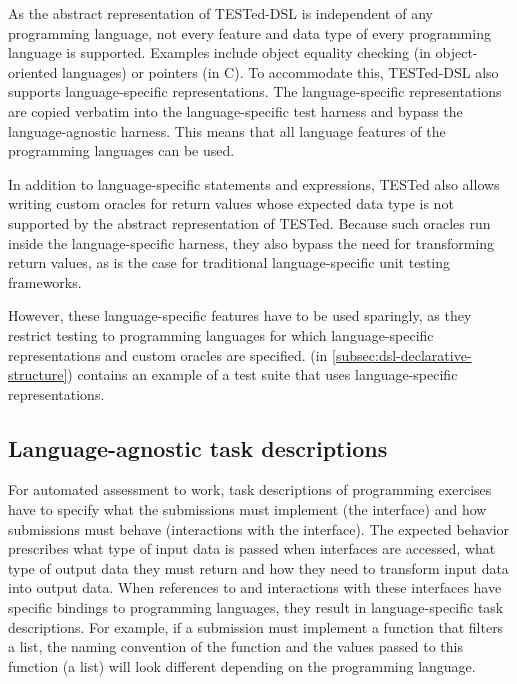 \documentclass[../main]{subfiles}
\begin{document}
As the abstract representation of TESTed-DSL is independent of any programming language, not every feature and data type of every programming language is supported.
Examples include object equality checking (in object-oriented languages) or pointers (in C).
To accommodate this, TESTed-DSL also supports language-specific representations.
The language-specific representations are copied verbatim into the language-specific test harness and bypass the language-agnostic harness.
This means that all language features of the programming languages can be used.

In addition to language-specific statements and expressions, TESTed also allows writing custom oracles for return values whose expected data type is not supported by the abstract representation of TESTed.
Because such oracles run inside the language-specific harness, they also bypass the need for transforming return values, as is the case for traditional language-specific unit testing frameworks.

However, these language-specific features have to be used sparingly, as they restrict testing to programming languages for which language-specific representations and custom oracles are specified.
 (in \vref{subsec:dsl-declarative-structure}) contains an example of a test suite that uses language-specific representations.

\subsection{Language-agnostic task descriptions}\label{subsec:dsl-language-agnostic-task-descriptions}

For automated assessment to work, task descriptions of programming exercises have to specify what the submissions must implement (the interface) and how submissions must behave (interactions with the interface).
The expected behavior prescribes what type of input data is passed when interfaces are accessed, what type of output data they must return and how they need to transform input data into output data.
When references to and interactions with these interfaces have specific bindings to programming languages, they result in language-specific task descriptions.
For example, if a submission must implement a function that filters a list, the naming convention of the function and the values passed to this function (a list) will look different depending on the programming language.
\end{document}
